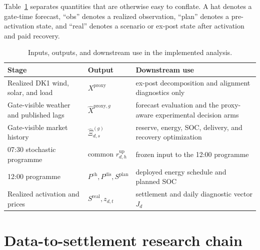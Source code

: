 \documentclass[11pt,a4paper]{article}
\begin{document}
Table~\ref{tab:dependency-roles} separates quantities that are otherwise easy
to conflate.  A hat denotes a gate-time forecast, ``obs'' denotes a realized
observation, ``plan'' denotes a pre-activation state, and ``real'' denotes a
scenario or ex-post state after activation and paid recovery.

\begin{table}[htbp]
  \centering
  \small
  \caption{Inputs, outputs, and downstream use in the implemented analysis.}
  \begin{tabular}{p{}p{}p{}}
    \toprule
    Stage & Output & Downstream use \\
    \midrule
    Realized DK1 wind, solar, and load
      & $X^{\mathrm{proxy}}$
      & ex-post decomposition and alignment diagnostics only \\
    Gate-visible weather and published lags
      & $\widehat X^{\mathrm{proxy},g}$
      & forecast evaluation and the proxy-aware experimental decision arms \\
    Gate-visible market history
      & $\widehat\Xi^{(g)}_{d,s}$
      & reserve, energy, SOC, delivery, and recovery optimization \\
    07:30 stochastic programme
      & common $r^{\mathrm{up}}_{d,h}$
      & frozen input to the 12:00 programme \\
    12:00 programme
      & $P^{\mathrm{ch}},P^{\mathrm{dis}},S^{\mathrm{plan}}$
      & deployed energy schedule and planned SOC \\
    Realized activation and prices
      & $S^{\mathrm{real}},z_{d,t}$
      & settlement and daily diagnostic vector $J_d$ \\
    \bottomrule
  \end{tabular}
  \label{tab:dependency-roles}
\end{table}

\section{Data-to-settlement research chain}
\end{document}
